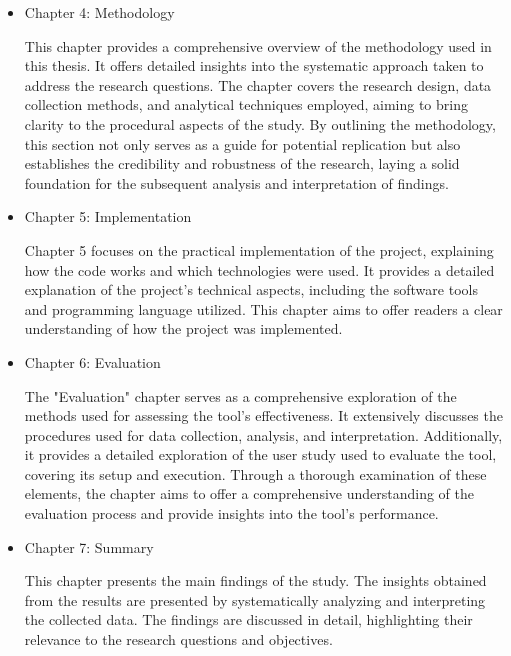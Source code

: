 \begin{itemize}
	\item Chapter 4: Methodology
	
	This chapter provides a comprehensive overview of the methodology used in this thesis. It offers detailed insights into the systematic approach taken to address the research questions. The chapter covers the research design, data collection methods, and analytical techniques employed, aiming to bring clarity to the procedural aspects of the study. By outlining the methodology, this section not only serves as a guide for potential replication but also establishes the credibility and robustness of the research, laying a solid foundation for the subsequent analysis and interpretation of findings.

    \item Chapter 5: Implementation
    
    Chapter 5 focuses on the practical implementation of the project, explaining how the code works and which technologies were used. It provides a detailed explanation of the project's technical aspects, including the software tools and programming language utilized. This chapter aims to offer readers a clear understanding of how the project was implemented.

    \item Chapter 6: Evaluation
    
    The "Evaluation" chapter serves as a comprehensive exploration of the methods used for assessing the tool's effectiveness. It extensively discusses the procedures used for data collection, analysis, and interpretation. Additionally, it provides a detailed exploration of the user study used to evaluate the tool, covering its setup and execution. Through a thorough examination of these elements, the chapter aims to offer a comprehensive understanding of the evaluation process and provide insights into the tool's performance.
	
	\item Chapter 7: Summary
	
	This chapter presents the main findings of the study. The insights obtained from the results are presented by systematically analyzing and interpreting the collected data. The findings are discussed in detail, highlighting their relevance to the research questions and objectives.
\end{itemize}